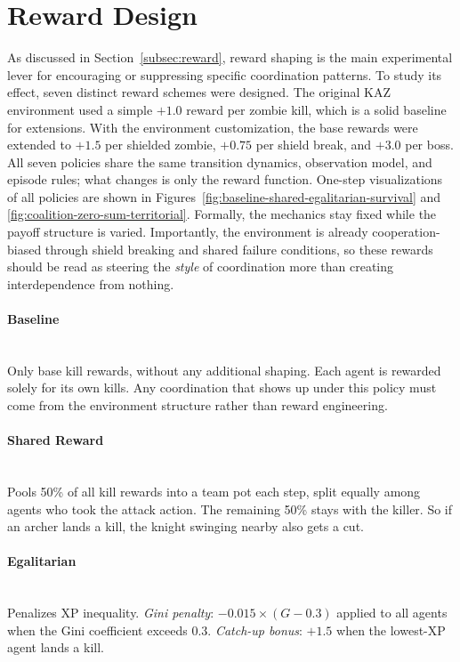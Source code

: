 \section{Reward Design}
\label{sec:reward_design}
As discussed in Section~\ref{subsec:reward}, reward shaping is the main experimental lever for encouraging or suppressing specific coordination patterns. To study its effect, seven distinct reward schemes were designed. The original KAZ environment used a simple $+1.0$ reward per zombie kill, which is a solid baseline for extensions. With the environment customization, the base rewards were extended to $+1.5$ per shielded zombie, $+0.75$ per shield break, and $+3.0$ per boss. All seven policies share the same transition dynamics, observation model, and episode rules; what changes is only the reward function. One-step visualizations of all policies are shown in Figures~\ref{fig:baseline-shared-egalitarian-survival} and \ref{fig:coalition-zero-sum-territorial}. Formally, the mechanics stay fixed while the payoff structure is varied. Importantly, the environment is already cooperation-biased through shield breaking and shared failure conditions, so these rewards should be read as steering the \emph{style} of coordination more than creating interdependence from nothing.

\paragraph{Baseline}\mbox{}\\
Only base kill rewards, without any additional shaping. Each agent is rewarded solely for its own kills. Any coordination that shows up under this policy must come from the environment structure rather than reward engineering.

\paragraph{Shared Reward}\mbox{}\\
Pools 50\% of all kill rewards into a team pot each step, split equally among agents who took the attack action. The remaining 50\% stays with the killer. So if an archer lands a kill, the knight swinging nearby also gets a cut.

\paragraph{Egalitarian}\mbox{}\\
Penalizes XP inequality. \emph{Gini penalty}: $-0.015 \times (G - 0.3)$ applied to all agents when the Gini coefficient exceeds $0.3$. \emph{Catch-up bonus}: $+1.5$ when the lowest-XP agent lands a kill.


